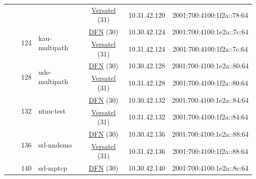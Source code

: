 \begin{small}
\begin{center}
\begin{longtable}{|c|c|c|c|c|c|c|c|}
  &  &  &  & \multicolumn{2}{|c|}{\tiny{\href{http://www.versatel.de}{Versatel} (31)}} & \tiny{10.31.42.120} & \tiny{2001:700:4100:1f2a::78:64} \\* \cline{3-3}\cline{4-4}\cline{5-5}\cline{6-6}\cline{7-7}\cline{8-8}
  &  & \multirow{2}{*}{\tiny{124}} & \multicolumn{1}{|l|}{\multirow{2}{*}{\tiny{kau-multipath}}} & \multicolumn{2}{|c|}{\tiny{\href{https://www.dfn.de}{DFN} (30)}} & \tiny{10.30.42.124} & \tiny{2001:700:4100:1e2a::7c:64} \\* \cline{5-5}\cline{6-6}\cline{7-7}\cline{8-8}
  &  &  &  & \multicolumn{2}{|c|}{\tiny{\href{http://www.versatel.de}{Versatel} (31)}} & \tiny{10.31.42.124} & \tiny{2001:700:4100:1f2a::7c:64} \\* \cline{3-3}\cline{4-4}\cline{5-5}\cline{6-6}\cline{7-7}\cline{8-8}
  &  & \multirow{2}{*}{\tiny{128}} & \multicolumn{1}{|l|}{\multirow{2}{*}{\tiny{ude-multipath}}} & \multicolumn{2}{|c|}{\tiny{\href{https://www.dfn.de}{DFN} (30)}} & \tiny{10.30.42.128} & \tiny{2001:700:4100:1e2a::80:64} \\* \cline{5-5}\cline{6-6}\cline{7-7}\cline{8-8}
  &  &  &  & \multicolumn{2}{|c|}{\tiny{\href{http://www.versatel.de}{Versatel} (31)}} & \tiny{10.31.42.128} & \tiny{2001:700:4100:1f2a::80:64} \\* \cline{3-3}\cline{4-4}\cline{5-5}\cline{6-6}\cline{7-7}\cline{8-8}
  &  & \multirow{2}{*}{\tiny{132}} & \multicolumn{1}{|l|}{\multirow{2}{*}{\tiny{ntnu-test}}} & \multicolumn{2}{|c|}{\tiny{\href{https://www.dfn.de}{DFN} (30)}} & \tiny{10.30.42.132} & \tiny{2001:700:4100:1e2a::84:64} \\* \cline{5-5}\cline{6-6}\cline{7-7}\cline{8-8}
  &  &  &  & \multicolumn{2}{|c|}{\tiny{\href{http://www.versatel.de}{Versatel} (31)}} & \tiny{10.31.42.132} & \tiny{2001:700:4100:1f2a::84:64} \\* \cline{3-3}\cline{4-4}\cline{5-5}\cline{6-6}\cline{7-7}\cline{8-8}
  &  & \multirow{2}{*}{\tiny{136}} & \multicolumn{1}{|l|}{\multirow{2}{*}{\tiny{srl-nndemo}}} & \multicolumn{2}{|c|}{\tiny{\href{https://www.dfn.de}{DFN} (30)}} & \tiny{10.30.42.136} & \tiny{2001:700:4100:1e2a::88:64} \\* \cline{5-5}\cline{6-6}\cline{7-7}\cline{8-8}
  &  &  &  & \multicolumn{2}{|c|}{\tiny{\href{http://www.versatel.de}{Versatel} (31)}} & \tiny{10.31.42.136} & \tiny{2001:700:4100:1f2a::88:64} \\* \cline{3-3}\cline{4-4}\cline{5-5}\cline{6-6}\cline{7-7}\cline{8-8}
  &  & \multirow{2}{*}{\tiny{140}} & \multicolumn{1}{|l|}{\multirow{2}{*}{\tiny{srl-mptcp}}} & \multicolumn{2}{|c|}{\tiny{\href{https://www.dfn.de}{DFN} (30)}} & \tiny{10.30.42.140} & \tiny{2001:700:4100:1e2a::8c:64} \\* \cline{5-5}\cline{6-6}\cline{7-7}\cline{8-8}

\end{longtable}
\end{center}
\end{small}
